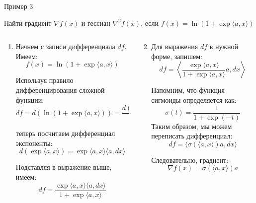\documentclass[
  9pt,
  ignorenonframetext,
  aspectratio=169,
]{beamer}
\begin{document}
\begin{frame}{Пример 3}
\label{ux43fux440ux438ux43cux435ux440-3}
\begin{tcolorbox}[enhanced jigsaw, bottomrule=.15mm, title=\textcolor{quarto-callout-color}{\faInfo}\hspace{0.5em}{Example}, breakable, opacitybacktitle=0.6, colbacktitle=quarto-callout-color!10!white, left=2mm, bottomtitle=1mm, colback=white, colframe=quarto-callout-color-frame, titlerule=0mm, toptitle=1mm, arc=.35mm, rightrule=.15mm, coltitle=black, toprule=.15mm, opacityback=0, leftrule=.75mm]

Найти градиент \(\nabla f(x)\) и гессиан \(\nabla^2f(x)\), если
\(f(x) = \ln \left( 1 + \exp\langle a,x\rangle\right)\)

\end{tcolorbox}

\pause

\begin{columns}[T]
\begin{column}{0.5\linewidth}
\begin{enumerate}[<+->]
\item
  Начнем с записи дифференциала \(df\). Имеем: \[
   f(x) = \ln \left( 1 + \exp\langle a, x\rangle\right)
   \]

  Используя правило дифференцирования сложной функции: \[
   df = d \left( \ln \left( 1 + \exp\langle a, x\rangle\right) \right)
   = \frac{d \left( 1 + \exp\langle a, x\rangle \right)}{1 + \exp\langle a, x\rangle}
   \]

  теперь посчитаем дифференциал экспоненты: \[
   d \left( \exp\langle a, x\rangle \right) = \exp\langle a, x\rangle \langle a, dx\rangle
   \]

  Подставляя в выражение выше, имеем: \[
   df = \frac{\exp\langle a, x\rangle \langle a, dx\rangle}{1 + \exp\langle a, x\rangle}
   \]
\end{enumerate}
\end{column}

\pause

\begin{column}{0.5\linewidth}
\begin{enumerate}[<+->]
\setcounter{enumi}{1}
\item
  Для выражения \(df\) в нужной форме, запишем: \[
   df = \left\langle \frac{\exp\langle a, x\rangle}{1 + \exp\langle a, x\rangle} a, dx\right\rangle
   \]

  Напомним, что функция сигмоиды определяется как: \[
   \sigma(t) = \frac{1}{1 + \exp(-t)}
   \] Таким образом, мы можем переписать дифференциал: \[
   df = \langle \sigma(\langle a, x\rangle) a, dx \rangle
   \]

  Следовательно, градиент: \[
   \nabla f(x) = \sigma(\langle a, x\rangle) a
   \]
\end{enumerate}
\end{column}
\end{columns}
\end{frame}
\end{document}
